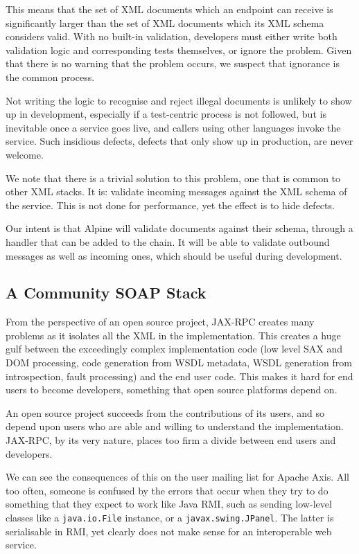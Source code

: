 This means that the set of XML documents which an endpoint can receive
is significantly larger than the set of XML documents which its XML
schema considers valid. With no built-in validation, developers must
either write both validation logic and corresponding tests themselves,
or ignore the problem. Given that there is no warning that the problem
occurs, we suspect that ignorance is the common process. 

Not writing the logic to recognise and reject illegal documents is
unlikely to show up in development, especially if a test-centric
process is not followed, but is inevitable once a service goes live,
and callers using other languages invoke the service. Such insidious
defects, defects that only show up in production, are never welcome.

We note that there is a trivial solution to this problem, one that is
common to other XML stacks. It is: validate incoming messages against
the XML schema of the service. This is not done for performance, yet
the effect is to hide defects.

Our intent is that Alpine will validate documents against their schema,
through a handler that can be added to the chain. It will be able to 
validate outbound messages as well as incoming ones, which should be useful
during development. 

\subsection{A Community SOAP Stack}
\label{alpine:community}
From the perspective of an open source project, JAX-RPC creates many
problems as it isolates all the XML in the implementation. This
creates a huge gulf between the exceedingly complex implementation
code (low level SAX and DOM processing, code generation from WSDL
metadata, WSDL generation from introspection, fault processing) and
the end user code.  This makes it hard for end users to become
developers, something that open source platforms depend on.  

An open source project succeeds from the contributions of its users,
and so depend upon users who are able and willing to understand the
implementation. JAX-RPC, by its very nature, places too firm a divide
between end users and developers.

We can see the consequences of this on the user mailing list for
Apache Axis. All too often, someone is confused by the errors that
occur when they try to do something that they expect to work like
Java RMI, such as sending low-level classes like a \verb|java.io.File|
instance, or a \verb|javax.swing.JPanel|. The latter is serialisable
in RMI, yet clearly does not make sense for an interoperable web
service.

